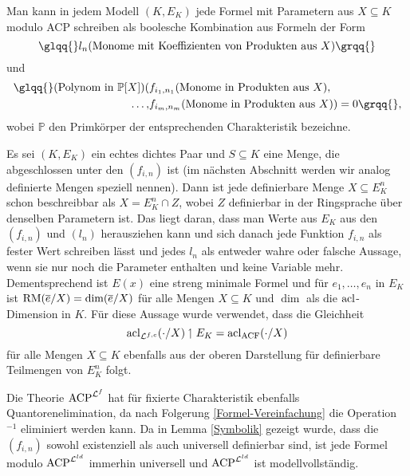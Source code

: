     \begin{corollary}\label{Formel-Vereinfachung}
    	Man kann in jedem Modell $(K,E_K)$ jede Formel mit Parametern aus $X\subseteq K$ modulo ACP schreiben als boolesche Kombination aus Formeln der Form $$\glqq{}l_n(\text{Monome mit Koeffizienten von Produkten aus }X)\grqq{}$$ und
    	\begin{align*}
    	\text{\glqq{}}(\text{Polynom in }\mathbb{P}[X])(&f_{i_1,n_1}(\text{Monome in Produkten aus }X),\\\dots,&f_{i_m,n_m}(\text{Monome in Produkten aus }X))=0\grqq{},
    	\end{align*}
        wobei $\mathbb{P}$ den Primkörper der entsprechenden Charakteristik bezeichne.
    \end{corollary}
    \begin{corollary}
    	Es sei $(K,E_K)$ ein echtes dichtes Paar und $S\subseteq K$ eine Menge, die abgeschlossen unter den $(f_{i,n})$ ist (im nächsten Abschnitt werden wir analog definierte Mengen speziell nennen). Dann ist jede definierbare Menge $X\subseteq E_K^n$ schon beschreibbar als $X=E_K^n\cap Z$, wobei $Z$ definierbar in der Ringsprache über denselben Parametern ist. Das liegt daran, dass man Werte aus $E_K$ aus den $(f_{i,n})$ und $(l_n)$ herausziehen kann und sich danach jede Funktion $f_{i,n}$ als fester Wert schreiben lässt und jedes $l_n$ als entweder wahre oder falsche Aussage, wenn sie nur noch die Parameter enthalten und keine Variable mehr.\\ Dementsprechend ist $E(x)$ eine streng minimale Formel und für $e_1,\dots,e_n$ in $E_K$ ist $\operatorname{RM}(\overline{e}/X)=\dim(\overline{e}/X)$ für alle Mengen $X\subseteq K$ und $\dim$ als die $\operatorname{acl}$-Dimension in $K$. Für diese Aussage wurde verwendet, dass die Gleichheit $$\operatorname{acl}_{\mathcal{L}^{f,c}}(\cdot/X)\upharpoonleft E_K=\operatorname{acl}_{\operatorname{ACF}}(\cdot/X)$$ für alle Mengen $X\subseteq K$ ebenfalls aus der oberen Darstellung für definierbare Teilmengen von $E_K^n$ folgt.
    \end{corollary}
    \begin{corollary}
    	Die Theorie $\operatorname{ACP}^{\mathcal{L}^f}$ hat für fixierte Charakteristik ebenfalls Quantorenelimination, da nach Folgerung \ref{Formel-Vereinfachung} die Operation \glqq{}$^{-1}$\grqq{} eliminiert werden kann. Da in Lemma \ref{Symbolik} gezeigt wurde, dass die $(f_{i,n})$ sowohl existenziell als auch universell definierbar sind, ist jede Formel modulo $\operatorname{ACP}^{\mathcal{L}^{ld}}$ immerhin universell und $\operatorname{ACP}^{\mathcal{L}^{ld}}$ ist modellvollständig.
    \end{corollary}

